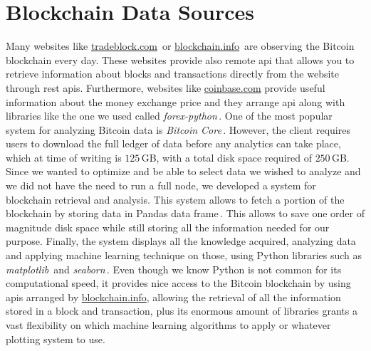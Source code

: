 \documentclass[USenglish]{uit-thesis}
\begin{document}
\section{Blockchain Data Sources}
Many websites like \url{tradeblock.com}\,\cite{tradeblock}
or \url{blockchain.info}\,\cite{bitcoin_blockchain}
are observing the Bitcoin blockchain every day.
These websites provide also remote \gls{api} 
that allows you to retrieve information about
blocks and transactions directly from
the website through \gls{rest} \gls{api}s.
Furthermore, websites like
\url{coinbase.com} provide useful information about the
money exchange price and they arrange \gls{api} along with
libraries like the one we used called
\emph{forex-python}\,\cite{forex-python}.
One of the most popular system for analyzing Bitcoin
data is \emph{Bitcoin Core}\,\cite{bitcoincore}.
However, the client requires users to download
the full ledger of data before any analytics
can take place, which at time of writing is
$125$\,GB, with a total disk space required of
$250$\,GB.
Since we wanted to optimize and
be able to select data we wished to analyze and
we did not have the need to run a full node,
we developed a system for blockchain retrieval and analysis.
This system allows to fetch a portion of the blockchain by
storing data in Pandas data frame\,\cite{pandas}.
This allows to save one order of magnitude disk space
while still storing all the information
needed for our purpose. Finally, the system
displays all the knowledge acquired,
analyzing data and applying machine learning technique
on those, using Python libraries
such as \emph{matplotlib}\,\cite{matplotlib} and
\emph{seaborn}\,\cite{michael_waskom_seaborn}.
Even though we know
Python is not common for its computational speed,
it provides nice access to the
Bitcoin blockchain by using \gls{api}s arranged
by \url{blockchain.info}, allowing the retrieval
of all the information stored in a block and transaction,
plus its enormous amount of libraries grants
a vast flexibility on which machine learning algorithms
to apply or whatever plotting system to use.
\end{document}
